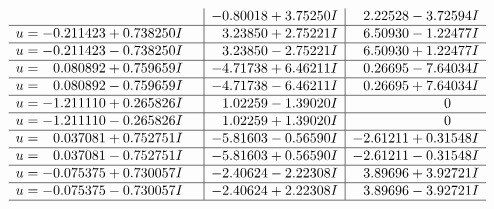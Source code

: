 \documentclass[1p]{elsarticle_modified}
\theoremstyle{definition}
\begin{document}
$$\begin{array}{c|c|c}
 & -0.80018 + 3.75250 I & \phantom{-}2.22528 - 3.72594 I \\ \hline\begin{aligned}
u &= -0.211423 + 0.738250 I\end{aligned}
 & \phantom{-}3.23850 + 2.75221 I & \phantom{-}6.50930 - 1.22477 I \\ \hline\begin{aligned}
u &= -0.211423 - 0.738250 I\end{aligned}
 & \phantom{-}3.23850 - 2.75221 I & \phantom{-}6.50930 + 1.22477 I \\ \hline\begin{aligned}
u &= \phantom{-}0.080892 + 0.759659 I\end{aligned}
 & -4.71738 + 6.46211 I & \phantom{-}0.26695 - 7.64034 I \\ \hline\begin{aligned}
u &= \phantom{-}0.080892 - 0.759659 I\end{aligned}
 & -4.71738 - 6.46211 I & \phantom{-}0.26695 + 7.64034 I \\ \hline\begin{aligned}
u &= -1.211110 + 0.265826 I\end{aligned}
 & \phantom{-}1.02259 - 1.39020 I & \phantom{-0.000000 } 0 \\ \hline\begin{aligned}
u &= -1.211110 - 0.265826 I\end{aligned}
 & \phantom{-}1.02259 + 1.39020 I & \phantom{-0.000000 } 0 \\ \hline\begin{aligned}
u &= \phantom{-}0.037081 + 0.752751 I\end{aligned}
 & -5.81603 - 0.56590 I & -2.61211 + 0.31548 I \\ \hline\begin{aligned}
u &= \phantom{-}0.037081 - 0.752751 I\end{aligned}
 & -5.81603 + 0.56590 I & -2.61211 - 0.31548 I \\ \hline\begin{aligned}
u &= -0.075375 + 0.730057 I\end{aligned}
 & -2.40624 - 2.22308 I & \phantom{-}3.89696 + 3.92721 I \\ \hline\begin{aligned}
u &= -0.075375 - 0.730057 I\end{aligned}
 & -2.40624 + 2.22308 I & \phantom{-}3.89696 - 3.92721 I\\
 \hline 
 \end{array}$$\newpage$$\begin{array}{c|c|c}  

\end{array}$$
\end{document}

